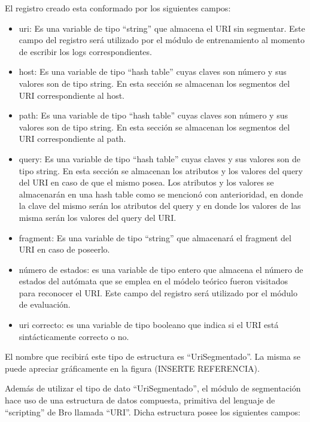 El registro creado esta conformado por los siguientes campos:
\begin{itemize}
\item uri: Es una variable de tipo ``string'' que almacena el URI sin segmentar. Este campo del registro será utilizado por el módulo de entrenamiento al momento de escribir los logs correspondientes.
\item host: Es una variable de tipo ``hash table'' cuyas claves son número y sus valores  son de tipo string. En esta sección se almacenan los segmentos del URI correspondiente al host.
\item path: Es una variable de tipo ``hash table'' cuyas claves son número y sus valores  son de tipo string. En esta sección se almacenan los segmentos del URI correspondiente al path.
\item query: Es una variable de tipo ``hash table'' cuyas claves y sus valores son de tipo string. En esta sección se almacenan los atributos y los valores del query del URI en caso de que el mismo posea. Los atributos y los valores se almacenarán en una hash table como se mencionó con anterioridad, en donde la clave del mismo serán los atributos del query y en donde los valores de las misma serán los valores del query del URI.
\item fragment: Es una variable de tipo ``string'' que almacenará el fragment del URI en caso de poseerlo.
\item número de estados: es una variable de tipo entero que almacena el número de estados del autómata que se emplea en el módelo teórico fueron visitados para reconocer el URI. Este campo del registro será utilizado por el módulo de evaluación.
\item uri correcto: es una variable de tipo booleano que indica si el URI está sintácticamente correcto o no.
\end{itemize}

El nombre que recibirá este tipo de estructura es ``UriSegmentado''. La misma se puede apreciar gráficamente en la figura (INSERTE REFERENCIA).

Además de utilizar el tipo de dato ``UriSegmentado'', el módulo de segmentación hace uso de una estructura de datos compuesta, primitiva del lenguaje de ``scripting'' de Bro llamada  ``URI''. Dicha estructura posee los siguientes campos:

